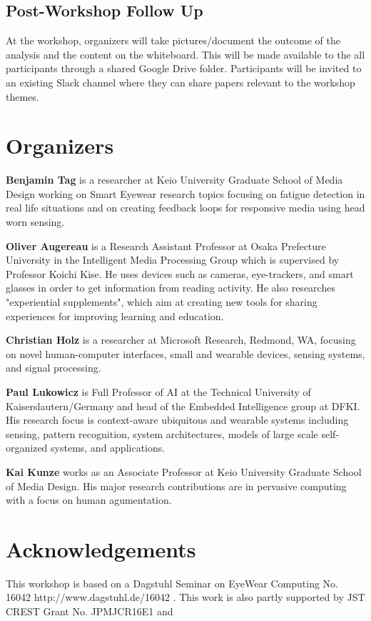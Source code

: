 \documentclass{sigchi-ext}
\begin{document}
\subsection{Post-Workshop Follow Up}
At the workshop, organizers will take pictures/document the outcome of the analysis and the content on the whiteboard. This will be made available to the all participants through a shared Google Drive folder. Participants will be invited to an existing Slack channel where they can share papers relevant to the workshop themes.

\section{Organizers}

{\bf Benjamin Tag} is a researcher at Keio University Graduate School of Media Design working on Smart Eyewear research topics focusing on fatigue detection in real life situations and on creating feedback loops for responsive media using head worn sensing.

{\bf Oliver Augereau} is a Research Assistant Professor at Osaka Prefecture University in the Intelligent Media Processing Group which is supervised by Professor Koichi Kise. He uses devices such as cameras, eye-trackers, and smart glasses in order to get information from reading activity. He also researches "experiential supplements", which aim at creating new tools for sharing experiences for improving learning and education.

{\bf Christian Holz} is a researcher at Microsoft Research, Redmond, WA, focusing on novel human-computer interfaces, small and wearable devices, sensing systems, and signal processing.

{\bf Paul Lukowicz} is Full Professor of AI at the Technical University of Kaiserslautern/Germany and head of the Embedded Intelligence group at DFKI. His research focus is context-aware ubiquitous and wearable systems including sensing, pattern recognition, system architectures, models of large scale self-organized systems, and applications.

{\bf Kai Kunze} works as an Associate Professor at Keio University Graduate School of Media Design. His major research contributions are in pervasive computing with a focus on human agumentation.

\section{Acknowledgements}
This workshop is based on a Dagstuhl Seminar on EyeWear Computing No. 16042 http://www.dagstuhl.de/16042 . This work is also partly supported by JST CREST Grant No. JPMJCR16E1 and  

\balance{} 



\end{document}
